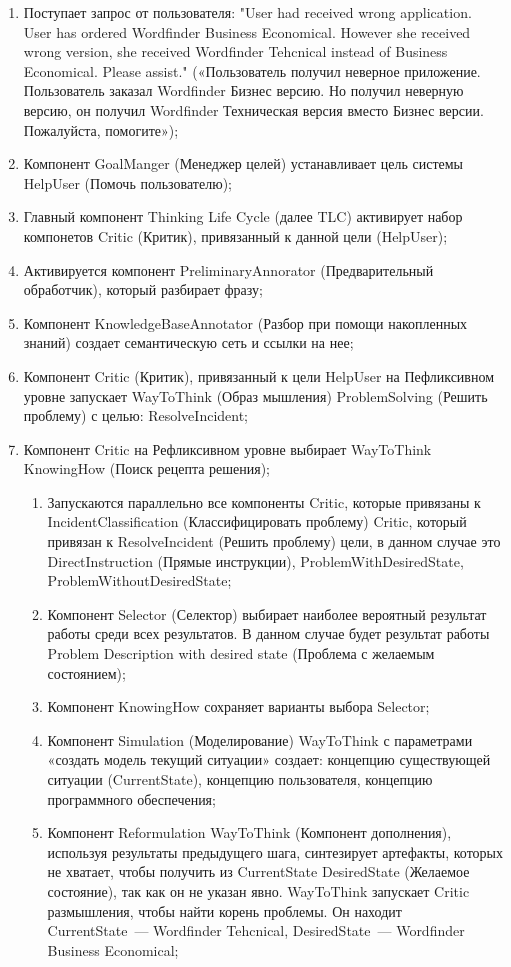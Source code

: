  \begin{enumerate}
	\item Поступает запрос от пользователя: 
	"User had received wrong application. User has ordered Wordfinder Business Economical. However she received wrong version, she received Wordfinder Tehcnical instead of Business Economical. Please assist." («Пользователь получил неверное приложение. Пользователь заказал Wordfinder Бизнес версию. Но получил неверную версию, он получил Wordfinder Техническая версия вместо Бизнес версии. Пожалуйста, помогите»);
	\item Компонент GoalManger (Менеджер целей) устанавливает цель системы HelpUser (Помочь пользователю);
	\item Главный компонент Thinking Life Cycle (далее TLC) активирует набор компонетов Critic (Критик), привязанный к данной цели (HelpUser); 
	\item Активируется компонент PreliminaryAnnorator (Предварительный обработчик), который разбирает фразу;
	\item Компонент KnowledgeBaseAnnotator (Разбор при помощи накопленных знаний) создает семантическую сеть и ссылки на нее;
	\item Компонент Critic (Критик), привязанный к цели HelpUser на Пефликсивном уровне запускает WayToThink (Образ мышления) ProblemSolving (Решить проблему) с целью: ResolveIncident;
	\item Компонент Critic на Рефликсивном уровне выбирает WayToThink KnowingHow (Поиск рецепта решения);
	\begin{enumerate}
	\item Запускаются параллельно все компоненты Critic, которые привязаны к IncidentClassification (Классифицировать проблему) Critic, который привязан к ResolveIncident (Решить проблему) цели, в данном случае это DirectInstruction (Прямые инструкции), ProblemWithDesiredState, ProblemWithoutDesiredState;
	\item Компонент Selector (Селектор) выбирает наиболее вероятный результат работы среди всех результатов. В данном случае будет результат работы Problem Description with desired state (Проблема с желаемым состоянием);
	\item Компонент KnowingHow сохраняет варианты выбора Selector;
	\item Компонент Simulation (Моделирование) WayToThink с параметрами «создать модель текущий ситуации» создает: концепцию существующей ситуации (CurrentState), концепцию пользователя, концепцию программного обеспечения;
	\item Компонент Reformulation WayToThink (Компонент дополнения), используя результаты предыдущего шага, синтезирует артефакты, которых не хватает, чтобы получить из CurrentState DesiredState (Желаемое состояние), так как он не указан явно. WayToThink запускает Critic размышления, чтобы найти корень проблемы. Он находит CurrentState~--- Wordfinder Tehcnical, DesiredState~--- Wordfinder Business Economical;

\end{enumerate}
\end{enumerate}
